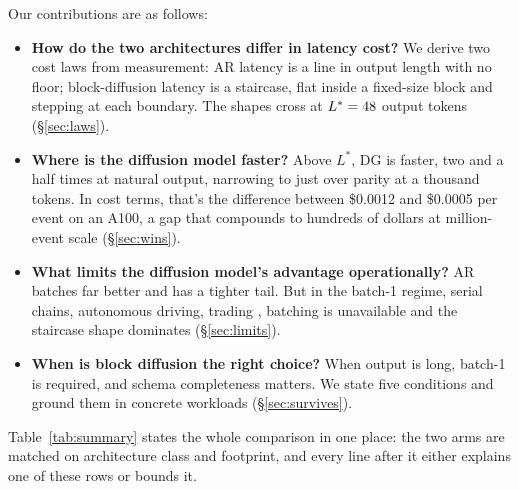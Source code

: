 Our contributions are as follows:
\begin{itemize}[leftmargin=1.5em]
\item \textbf{How do the two architectures differ in latency cost?}
We derive two cost laws from measurement: AR latency is a line in output
length with no floor; block-diffusion latency is a staircase, flat inside
a fixed-size block and stepping at each boundary. The shapes cross at
$L^{*} = 48$ output tokens (\S\ref{sec:laws}).

\item \textbf{Where is the diffusion model faster?}
Above $L^{*}$, DG is faster, two and a half times at natural output,
narrowing to just over parity at a thousand tokens. In cost terms, that's the difference
between \$0.0012 and \$0.0005 per event on an A100, a gap that
compounds to hundreds of dollars at million-event scale
(\S\ref{sec:wins}).

\item \textbf{What limits the diffusion model's advantage operationally?}
AR batches far better and has a tighter tail. But in the
batch-1 regime, serial chains, autonomous driving, trading ,
batching is unavailable and the staircase shape dominates
(\S\ref{sec:limits}).

\item \textbf{When is block diffusion the right choice?}
When output is long, batch-1 is required, and schema completeness
matters. We state five conditions and ground them in concrete
workloads (\S\ref{sec:survives}).
\end{itemize}

Table~\ref{tab:summary} states the whole comparison in one place: the
two arms are matched on architecture class and footprint, and every
line after it either explains one of these rows or bounds it.

